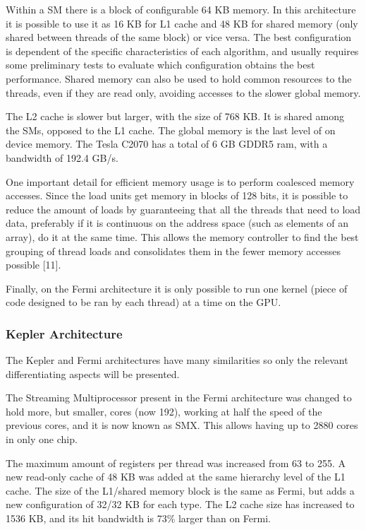 Within a SM there is a block of configurable 64 KB memory. In this architecture it is possible to use it as 16 KB for L1 cache and 48 KB for shared memory (only shared between threads of the same block) or vice versa. The best configuration is dependent of the specific characteristics of each algorithm, and usually requires some preliminary tests to evaluate which configuration obtains the best performance. Shared memory can also be used to hold common resources to the threads, even if they are read only, avoiding accesses to the slower global memory.

The L2 cache is slower but larger, with the size of 768 KB. It is shared among the SMs, opposed to the L1 cache. The global memory is the last level of on device memory. The Tesla C2070 has a total of 6 GB GDDR5 ram, with a bandwidth of 192.4 GB/s.

One important detail for efficient memory usage is to perform coalesced memory accesses. Since the load units get memory in blocks of 128 bits, it is possible to reduce the amount of loads by guaranteeing that all the threads that need to load data, preferably if it is continuous on the address space (such as elements of an array), do it at the same time. This allows the memory controller to find the best grouping of thread loads and consolidates them in the fewer memory accesses possible [11].

Finally, on the Fermi architecture it is only possible to run one kernel (piece of \cuda code designed to be ran by each \cuda thread) at a time on the GPU.

\subsubsection{\nvidia Kepler Architecture}

The Kepler and Fermi architectures have many similarities so only the relevant differentiating aspects will be presented.

The Streaming Multiprocessor present in the Fermi architecture was changed to hold more, but smaller, \cuda cores (now 192), working at half the speed of the previous \cuda cores, and it is now known as SMX. This allows having up to 2880 \cuda cores in only one chip.

The maximum amount of registers per \cuda thread was increased from 63 to 255. A new read-only cache of 48 KB was added at the same hierarchy level of the L1 cache. The size of the L1/shared memory block is the same as Fermi, but adds a new configuration of 32/32 KB for each type. The L2 cache size has increased to 1536 KB, and its hit bandwidth is 73\% larger than on Fermi.

